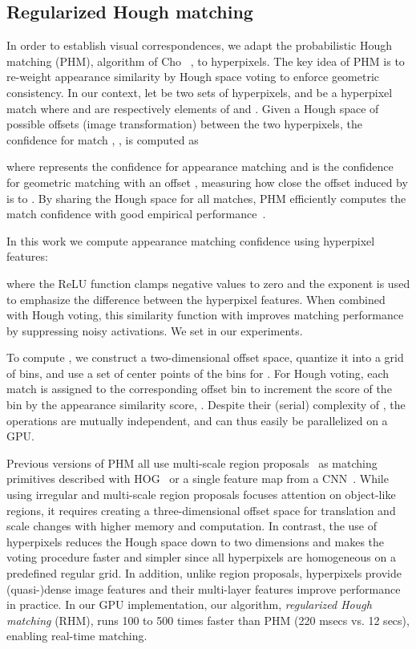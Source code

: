 \documentclass[10pt,twocolumn,letterpaper]{article}
\begin{document}
\subsection{Regularized Hough matching}\label{sec:RHM}
In order to establish visual correspondences, we adapt the probabilistic Hough matching (PHM), algorithm of Cho \etal ~\cite{cho2015unsupervised}, to hyperpixels. The key idea of PHM is to re-weight appearance similarity by Hough space voting to enforce geometric consistency. In our context, let  be two sets of hyperpixels, and  be a hyperpixel match where  and  are respectively elements of  and . Given a Hough space  of possible offsets (image transformation) between the two hyperpixels,  
the confidence for match , , is computed as  

where  represents the confidence for appearance matching and  is the confidence for geometric matching with an offset , measuring how close the offset induced by  is to . By sharing the Hough space  for all matches, PHM efficiently computes the match confidence with good empirical performance~\cite{cho2015unsupervised,ham2016proposal,han2017scnet}.

In this work we compute appearance matching confidence using hyperpixel features:    

where 
the ReLU function clamps negative values to zero and the exponent  is used to emphasize the difference between the hyperpixel features.
When combined with Hough voting, this similarity function with  improves matching performance by suppressing noisy activations. We set  in our experiments.

To compute , we construct a two-dimensional offset space, quantize it into a grid of bins, and use a set of center points of the bins for . For Hough voting, each match  is assigned to the corresponding offset bin to increment the score of the bin by the appearance similarity score, . Despite their (serial) complexity of , the operations are mutually independent, and can thus easily be parallelized on a GPU. 

Previous versions of PHM all use multi-scale region proposals~\cite{manen2013prime, pont2017multiscale, uijlings2013selective} as matching primitives described with HOG~\cite{cho2015unsupervised,ham2016proposal} or a single feature map from a CNN~\cite{ham2016proposal,han2017scnet}. While using irregular and multi-scale region proposals focuses attention on object-like regions, it requires creating a three-dimensional offset space for translation and scale changes with higher memory and computation. 
In contrast, the use of hyperpixels reduces the Hough space down to two dimensions and makes the voting procedure faster and simpler since all hyperpixels are homogeneous on a predefined regular grid.
In addition, unlike region proposals, hyperpixels provide (quasi-)dense image features and their multi-layer features improve performance in practice. 
In our GPU implementation, our algorithm, {\em regularized Hough matching} (RHM), runs 100 to 500 times faster than PHM (220 msecs vs. 12 secs), enabling real-time matching.
\iffalse
\end{document}
